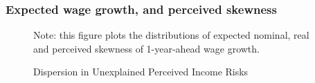 \subsubsection{Expected wage growth, and perceived skewness}
\label{appendix:other_hist}


        \begin{figure}[!ht]
    \caption{Dispersion in Unexplained Perceived Income Risks}
    \label{fig:histmoms_other}
	\begin{center}

\end{center}
    \begin{flushleft}Note: this figure plots the distributions of expected nominal, real and perceived skewness of 1-year-ahead wage growth.\end{flushleft}
    \end{figure}